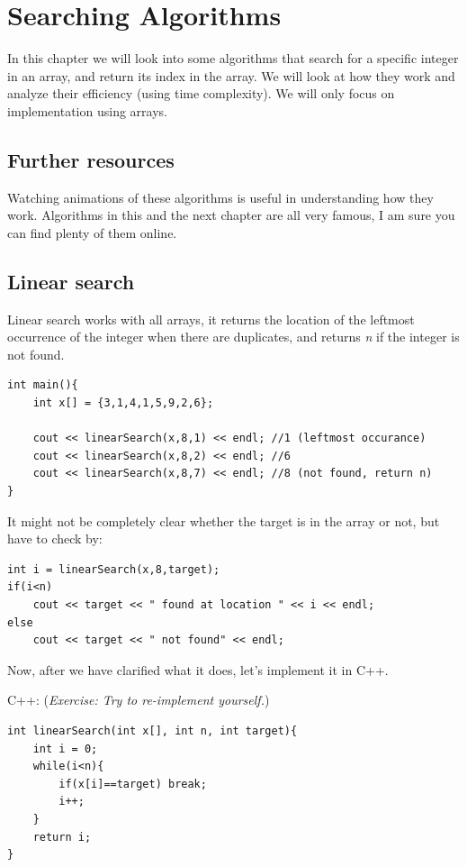 \chapter{Searching Algorithms}

In this chapter we will look into some algorithms that search for a specific integer in an array, and return its index in the array. We will look at how they work and analyze their efficiency (using time complexity). We will only focus on implementation using arrays.

\section{Further resources}

Watching animations of these algorithms is useful in understanding how they work. Algorithms in this and the next chapter are all very famous, I am sure you can find plenty of them online.

\section{Linear search}

Linear search works with all arrays, it returns the location of the leftmost occurrence of the integer when there are duplicates, and returns \textit{n} if the integer is not found.

\begin{lstlisting}
int main(){
    int x[] = {3,1,4,1,5,9,2,6};

    cout << linearSearch(x,8,1) << endl; //1 (leftmost occurance)
    cout << linearSearch(x,8,2) << endl; //6
    cout << linearSearch(x,8,7) << endl; //8 (not found, return n)
}
\end{lstlisting}

It might not be completely clear whether the target is in the array or not, but have to check by:

\begin{lstlisting}
int i = linearSearch(x,8,target);
if(i<n)
    cout << target << " found at location " << i << endl;
else 
    cout << target << " not found" << endl;
\end{lstlisting}

Now, after we have clarified what it does, let's implement it in C++.
\vspace{6mm}

C++: (\textit{Exercise: Try to re-implement yourself.})
\begin{lstlisting}
int linearSearch(int x[], int n, int target){
    int i = 0;
    while(i<n){
        if(x[i]==target) break;
        i++;
    }
    return i;
}
\end{lstlisting}

